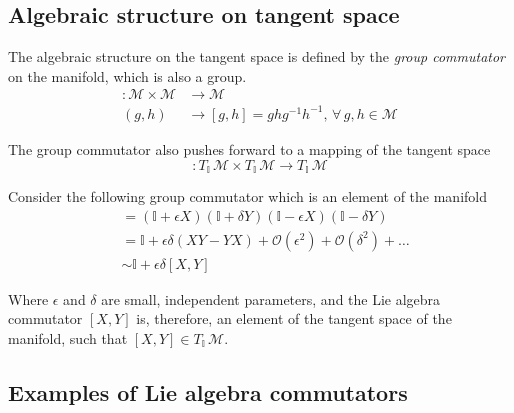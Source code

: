 \subsection*{Algebraic structure on tangent space}

\noindent The algebraic structure on the tangent space is defined by the \textit{group commutator} on the manifold, which is also a group. 
\begin{align}
[\, , \,] : \mathcal{M} \times \mathcal{M} &\rightarrow \mathcal{M} \\
(g, h) &\rightarrow [g, h] = ghg^{-1}h^{-1}, \, \forall \, g, h \in \mathcal{M}
\end{align}

\noindent The group commutator also pushes forward to a mapping of the tangent space
\begin{equation}
[\, , \,] : T_{\mathbb{I}} \, \mathcal{M} \times T_{\mathbb{I}} \, \mathcal{M} \rightarrow T_{\mathbb{I}} \, \mathcal{M}
\end{equation}

\noindent Consider the following group commutator which is an element of the manifold
\begin{align}
[\mathbb{I} + \epsilon X, \mathbb{I} + \delta Y] &= (\mathbb{I} + \epsilon X) (\mathbb{I} + \delta Y) (\mathbb{I} - \epsilon X) (\mathbb{I} - \delta Y) \\
&= \mathbb{I} + \epsilon \delta (XY - YX) + \mathcal{O}(\epsilon^2) + \mathcal{O}(\delta^2) + \dots \\
&\sim \mathbb{I} + \epsilon \delta [X, Y]
\end{align}

\noindent Where $\epsilon$ and $\delta$ are small, independent parameters, and the Lie algebra commutator $[X, Y]$ is, therefore, an element of the tangent space of the manifold, such that $[X,Y] \in T_{\mathbb{I}} \, \mathcal{M}$. \\

\subsection*{Examples of Lie algebra commutators}


